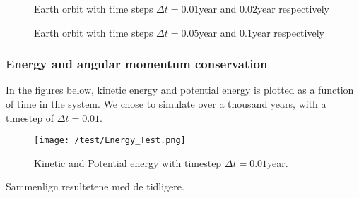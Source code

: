 \documentclass[../main.tex]{subfiles}
\begin{document}
\begin{figure}[!h]
  \centering
  \caption{Earth orbit with time steps $\Delta t = 0.01$year and $0.02$year respectively }
  \label{fig:results-Timestep1}
\end{figure}
\FloatBarrier
\begin{figure}[!h]
  \centering
  \caption{Earth orbit with time steps $\Delta t = 0.05$year and $0.1$year respectively }
  \label{fig:results-Timestep2}
\end{figure}
\FloatBarrier

\subsubsection{Energy and angular momentum conservation}\label{sec:results-test-conservation}
In the figures below, kinetic energy and potential energy is plotted as a function of time in the system. We chose to simulate over a thousand years, with a timestep of $\Delta t = 0.01$.
\begin{figure}[!h]
  \centering
  \texttt{[image: /test/Energy\_Test.png]} %
  \caption{Kinetic and Potential energy with timestep $\Delta t = 0.01$year.}
  \label{fig:results-Energies}
\end{figure}
\FloatBarrier

Sammenlign resultetene med de tidligere.
\end{document}
